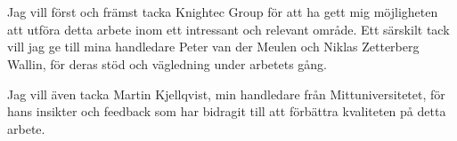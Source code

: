 \section*{}\label{sec:acknowledgements}
{} 


Jag vill först och främst tacka Knightec Group för att ha gett mig möjligheten att utföra detta arbete inom ett intressant och relevant område. Ett särskilt tack vill jag ge till mina handledare Peter van der Meulen och Niklas Zetterberg Wallin, för deras stöd och vägledning under arbetets gång.

Jag vill även tacka Martin Kjellqvist, min handledare från Mittuniversitetet, för hans insikter och feedback som har bidragit till att förbättra kvaliteten på detta arbete.
